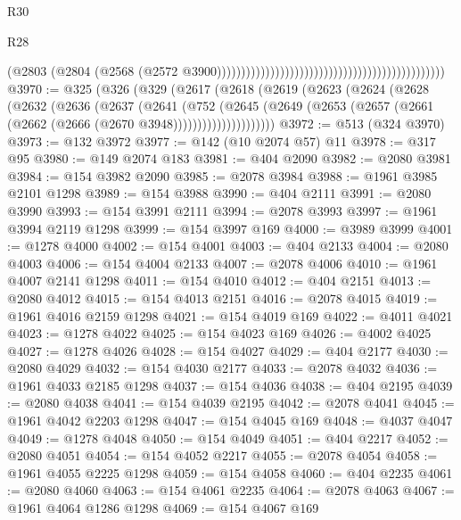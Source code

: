 \begin{lexlean}{R30}
\begin{lexlean}{R28}
\begin{coremodule}
{{{{{{{{{{{{{{{{{{{{{{{{{{{{{{{{{{{{{{{{{{{{{{{{{{{{{{{{{{{{{{{{{{{{{{{{{{{{{{{{{{{{{{{{{{{{{{{{{{{{{{{{{{{{{{{{{{{{{{{{{{{{{{{{{{{{{{{{{{{{{{{                                                                                          (@2803
                                                                                            (@2804
                                                                                              (@2568
                                                                                                (@2572
                                                                                                  @3900)))))))))))))))))))))))))))))))))))))))))))))))
@3970 := @325
    (@326
      (@329
        (@2617
          (@2618
            (@2619
              (@2623
                (@2624
                  (@2628
                    (@2632
                      (@2636
                        (@2637
                          (@2641
                            (@752
                              (@2645
                                (@2649
                                  (@2653
                                    (@2657 (@2661 (@2662 (@2666 (@2670 @3948)))))))))))))))))))))
@3972 := @513 (@324 @3970)
@3973 := @132 @3972
@3977 := @142 (@10 @2074 @57) @11
@3978 := @317 @95
@3980 := @149 @2074 @183
@3981 := @404 @2090
@3982 := @2080 @3981
@3984 := @154 @3982 @2090
@3985 := @2078 @3984
@3988 := @1961 @3985 @2101 @1298
@3989 := @154 @3988
@3990 := @404 @2111
@3991 := @2080 @3990
@3993 := @154 @3991 @2111
@3994 := @2078 @3993
@3997 := @1961 @3994 @2119 @1298
@3999 := @154 @3997 @169
@4000 := @3989 @3999
@4001 := @1278 @4000
@4002 := @154 @4001
@4003 := @404 @2133
@4004 := @2080 @4003
@4006 := @154 @4004 @2133
@4007 := @2078 @4006
@4010 := @1961 @4007 @2141 @1298
@4011 := @154 @4010
@4012 := @404 @2151
@4013 := @2080 @4012
@4015 := @154 @4013 @2151
@4016 := @2078 @4015
@4019 := @1961 @4016 @2159 @1298
@4021 := @154 @4019 @169
@4022 := @4011 @4021
@4023 := @1278 @4022
@4025 := @154 @4023 @169
@4026 := @4002 @4025
@4027 := @1278 @4026
@4028 := @154 @4027
@4029 := @404 @2177
@4030 := @2080 @4029
@4032 := @154 @4030 @2177
@4033 := @2078 @4032
@4036 := @1961 @4033 @2185 @1298
@4037 := @154 @4036
@4038 := @404 @2195
@4039 := @2080 @4038
@4041 := @154 @4039 @2195
@4042 := @2078 @4041
@4045 := @1961 @4042 @2203 @1298
@4047 := @154 @4045 @169
@4048 := @4037 @4047
@4049 := @1278 @4048
@4050 := @154 @4049
@4051 := @404 @2217
@4052 := @2080 @4051
@4054 := @154 @4052 @2217
@4055 := @2078 @4054
@4058 := @1961 @4055 @2225 @1298
@4059 := @154 @4058
@4060 := @404 @2235
@4061 := @2080 @4060
@4063 := @154 @4061 @2235
@4064 := @2078 @4063
@4067 := @1961 @4064 @1286 @1298
@4069 := @154 @4067 @169
}}}}}}}}}}}}}}}}}}}}}}}}}}}}}}}}}}}}}}}}}}}}}}}}}}}}}}}}}}}}}}}}}}}}}}}}}}}}}}}}}}}}}}}}}}}}}}}}}}}}}}}}}}}}}}}}}}}}}}}}}}}}}}}}}}}}}}}}}}}}}}}
\end{coremodule}
\end{lexlean}
\end{lexlean}
